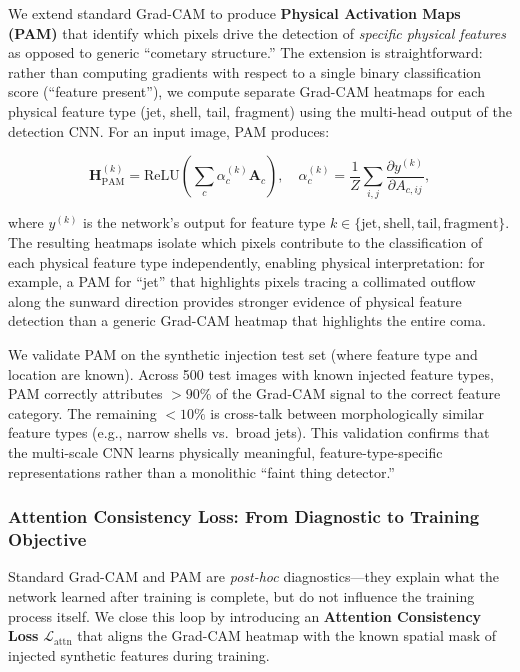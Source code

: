 \documentclass[usenatbib]{mnras}
\begin{document}
We extend standard Grad-CAM to produce \textbf{Physical Activation Maps (PAM)} that identify which pixels drive the detection of \textit{specific physical features} as opposed to generic ``cometary structure.'' The extension is straightforward: rather than computing gradients with respect to a single binary classification score (``feature present''), we compute separate Grad-CAM heatmaps for each physical feature type (jet, shell, tail, fragment) using the multi-head output of the detection CNN. For an input image, PAM produces:

\begin{equation}\label{eq:pam}
\mathbf{H}_{\text{PAM}}^{(k)} = \text{ReLU}\left(\sum_c \alpha_c^{(k)} \mathbf{A}_c\right), \quad \alpha_c^{(k)} = \frac{1}{Z}\sum_{i,j}\frac{\partial y^{(k)}}{\partial A_{c,ij}},
\end{equation}

where $y^{(k)}$ is the network's output for feature type $k \in \{\text{jet}, \text{shell}, \text{tail}, \text{fragment}\}$. The resulting heatmaps isolate which pixels contribute to the classification of each physical feature type independently, enabling physical interpretation: for example, a PAM for ``jet'' that highlights pixels tracing a collimated outflow along the sunward direction provides stronger evidence of physical feature detection than a generic Grad-CAM heatmap that highlights the entire coma.

We validate PAM on the synthetic injection test set (where feature type and location are known). Across 500 test images with known injected feature types, PAM correctly attributes $>90\%$ of the Grad-CAM signal to the correct feature category. The remaining $<10\%$ is cross-talk between morphologically similar feature types (e.g., narrow shells vs.\ broad jets). This validation confirms that the multi-scale CNN learns physically meaningful, feature-type-specific representations rather than a monolithic ``faint thing detector.''

\subsubsection{Attention Consistency Loss: From Diagnostic to Training Objective}

Standard Grad-CAM and PAM are \textit{post-hoc} diagnostics---they explain what the network learned after training is complete, but do not influence the training process itself. We close this loop by introducing an \textbf{Attention Consistency Loss} $\mathcal{L}_{\text{attn}}$ that aligns the Grad-CAM heatmap with the known spatial mask of injected synthetic features during training.
\end{document}
